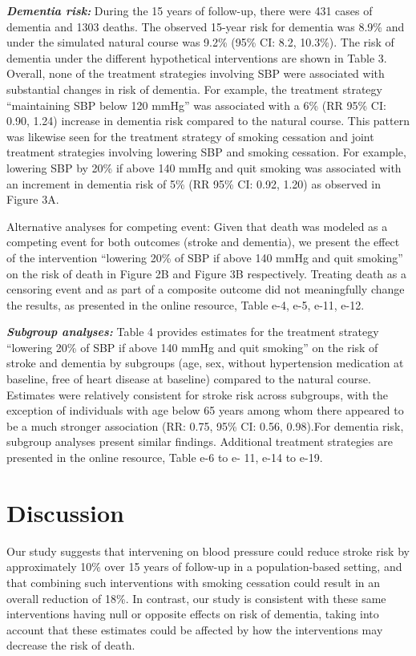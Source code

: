 \documentclass[
]{book}
\begin{document}
\textbf{\emph{Dementia risk:}} During the 15 years of follow-up, there were 431 cases of dementia and 1303 deaths. The observed 15-year risk for dementia was 8.9\% and under the simulated natural course was 9.2\% (95\% CI: 8.2, 10.3\%). The risk of dementia under the different hypothetical interventions are shown in Table 3. Overall, none of the treatment strategies involving SBP were associated with substantial changes in risk of dementia. For example, the treatment strategy ``maintaining SBP below 120 mmHg'' was associated with a 6\% (RR 95\% CI: 0.90, 1.24) increase in dementia risk compared to the natural course. This pattern was likewise seen for the treatment strategy of smoking cessation and joint treatment strategies involving lowering SBP and smoking cessation. For example, lowering SBP by 20\% if above 140 mmHg and quit smoking was associated with an increment in dementia risk of 5\% (RR 95\% CI: 0.92, 1.20) as observed in Figure 3A.

Alternative analyses for competing event: Given that death was modeled as a competing event for both outcomes (stroke and dementia), we present the effect of the intervention ``lowering 20\% of SBP if above 140 mmHg and quit smoking'' on the risk of death in Figure 2B and Figure 3B respectively. Treating death as a censoring event and as part of a composite outcome did not meaningfully change the results, as presented in the online resource, Table e-4, e-5, e-11, e-12.

\textbf{\emph{Subgroup analyses:}} Table 4 provides estimates for the treatment strategy ``lowering 20\% of SBP if above 140 mmHg and quit smoking'' on the risk of stroke and dementia by subgroups (age, sex, without hypertension medication at baseline, free of heart disease at baseline) compared to the natural course. Estimates were relatively consistent for stroke risk across subgroups, with the exception of individuals with age below 65 years among whom there appeared to be a much stronger association (RR: 0.75, 95\% CI: 0.56, 0.98).For dementia risk, subgroup analyses present similar findings. Additional treatment strategies are presented in the online resource, Table e-6 to e- 11, e-14 to e-19.

\hypertarget{discussion}{%
\section{Discussion}\label{discussion}}

Our study suggests that intervening on blood pressure could reduce stroke risk by approximately 10\% over 15 years of follow-up in a population-based setting, and that combining such interventions with smoking cessation could result in an overall reduction of 18\%. In contrast, our study is consistent with these same interventions having null or opposite effects on risk of dementia, taking into account that these estimates could be affected by how the interventions may decrease the risk of death.
\end{document}
